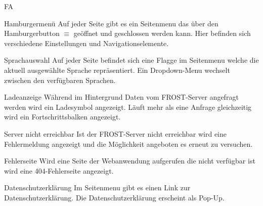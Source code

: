 \begin{Kriterien}{FA}
 \item[Hamburgermenü]
  Auf jeder Seite gibt es ein \gls{Seitenmenu} das über den Hamburgerbutton $\equiv$ geöffnet und geschlossen werden kann.
  Hier befinden sich verschiedene Einstellungen und Navigationselemente.

 \item[Sprachauswahl]
   Auf jeder Seite befindet sich eine Flagge im \gls{Seitenmenu} welche die aktuell ausgewählte Sprache repräsentiert.
   Ein \gls{Dropdown-Menu} wechselt zwischen den verfügbaren Sprachen.

 \item[Ladeanzeige]
  Während im Hintergrund Daten vom \gls{FROST-Server} angefragt werden wird ein Ladesymbol angezeigt.
  Läuft mehr als eine Anfrage gleichzeitig wird ein Fortschrittsbalken angezeigt.

 \item[Server nicht erreichbar]
  Ist der \gls{FROST-Server} nicht erreichbar wird eine Fehlermeldung angezeigt und die Möglichkeit angeboten es erneut zu versuchen.

 \item[Fehlerseite]
  Wird eine Seite der \gls{Webanwendung} aufgerufen die nicht verfügbar ist wird eine 404-Fehlerseite angezeigt.

 \item[Datenschutzerklärung]
  Im \gls{Seitenmenu} gibt es einen Link zur Datenschutzerklärung.
  Die Datenschutzerklärung erscheint als \gls{Pop-Up}.
\end{Kriterien}